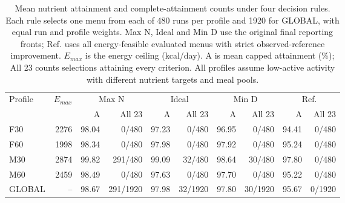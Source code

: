 \begin{table}[pos=t]
\centering\small
\setlength{\tabcolsep}{3pt}
\caption{Mean nutrient attainment and complete-attainment counts under four decision rules. Each rule selects one menu from each of 480 runs per profile and 1920 for GLOBAL, with equal run and profile weights. Max N, Ideal and Min D use the original final reporting fronts; Ref. uses all energy-feasible evaluated menus with strict observed-reference improvement. $E_{max}$ is the energy ceiling (kcal/day). A is mean capped attainment (\%); All 23 counts selections attaining every criterion. All profiles assume low-active activity with different nutrient targets and meal pools.}
\label{tab:nutrition-selections}
\begin{tabularx}{\textwidth}{Xr*{4}{rr}}
\toprule
Profile & $E_{max}$ & \multicolumn{2}{c}{Max N} & \multicolumn{2}{c}{Ideal} & \multicolumn{2}{c}{Min D} & \multicolumn{2}{c}{Ref.} \\
\cmidrule(lr){3-4}\cmidrule(lr){5-6}\cmidrule(lr){7-8}\cmidrule(lr){9-10}
 & & A & All 23 & A & All 23 & A & All 23 & A & All 23 \\
\midrule
F30 & 2276 & 98.04 & 0/480 & 97.23 & 0/480 & 96.95 & 0/480 & 94.41 & 0/480 \\
\midrule
F60 & 1998 & 98.34 & 0/480 & 97.98 & 0/480 & 97.92 & 0/480 & 95.24 & 0/480 \\
\midrule
M30 & 2874 & 99.82 & 291/480 & 99.09 & 32/480 & 98.64 & 30/480 & 97.80 & 0/480 \\
\midrule
M60 & 2459 & 98.49 & 0/480 & 97.63 & 0/480 & 97.70 & 0/480 & 95.22 & 0/480 \\
\midrule
GLOBAL & -- & 98.67 & 291/1920 & 97.98 & 32/1920 & 97.80 & 30/1920 & 95.67 & 0/1920 \\
\bottomrule
\end{tabularx}
\end{table}
